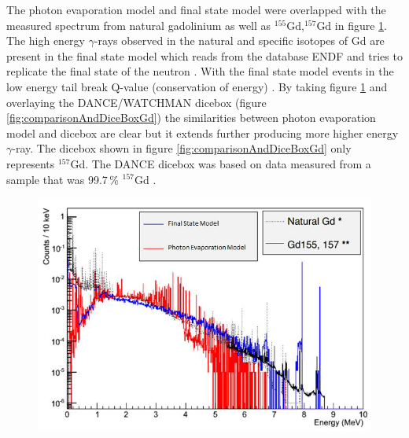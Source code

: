 The photon evaporation model and final state model were overlapped with the measured spectrum from natural gadolinium as well as $^{155}$Gd,$^{157}$Gd in figure \ref{fig:comparisonGd}. The high energy $\gamma$-rays observed in the natural and specific isotopes of Gd are present in the final state model which reads from the database ENDF \cite{BROWN20181} and tries to replicate the final state of the neutron \cite{koiTatsumi_2006}. With the final state model events in the low energy tail break Q-value (conservation of energy) \cite{YuChen_2015}. By taking figure \ref{fig:comparisonGd} and overlaying the DANCE/WATCHMAN dicebox (figure \ref{fig:comparisonAndDiceBoxGd}) the similarities between photon evaporation model and dicebox are clear but it extends further producing more higher energy $\gamma$-ray. The dicebox shown in figure \ref{fig:comparisonAndDiceBoxGd} only represents $^{157}$Gd. The DANCE dicebox was based on data measured from a sample that was  99.7\,\% $^{157}$Gd \cite{Chyzh_2011}. 

\begin{figure}[!h]
 \centering
 \includegraphics[width=0.7\linewidth]{Chapter4/Figs/Raster/gadolinium/comparisonGd.png}
 \label{fig:comparisonGd}
\end{figure}

